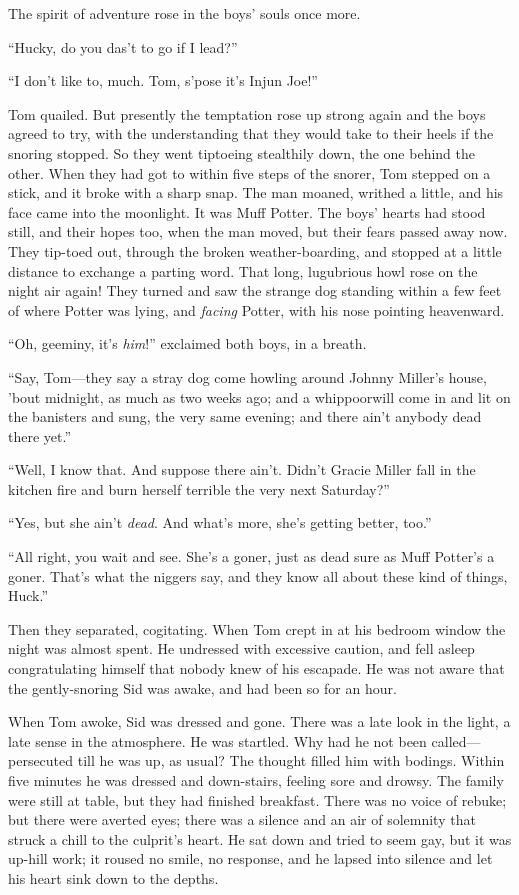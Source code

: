 \documentclass{book}
\begin{document}
The spirit of adventure rose in the boys’ souls once more.

“Hucky, do you das’t to go if I lead?”

“I don’t like to, much. Tom, s’pose it’s Injun Joe!”

Tom quailed. But presently the temptation rose up strong again and the boys agreed to try, with the understanding that they would take to their heels if the snoring stopped. So they went tiptoeing stealthily down, the one behind the other. When they had got to within five steps of the snorer, Tom stepped on a stick, and it broke with a sharp snap. The man moaned, writhed a little, and his face came into the moonlight. It was Muff Potter. The boys’ hearts had stood still, and their hopes too, when the man moved, but their fears passed away now. They tip-toed out, through the broken weather-boarding, and stopped at a little distance to exchange a parting word. That long, lugubrious howl rose on the night air again! They turned and saw the strange dog standing within a few feet of where Potter was lying, and \emph{facing} Potter, with his nose pointing heavenward.

“Oh, geeminy, it’s \emph{him}!” exclaimed both boys, in a breath.

“Say, Tom—they say a stray dog come howling around Johnny Miller’s house, ’bout midnight, as much as two weeks ago; and a whippoorwill come in and lit on the banisters and sung, the very same evening; and there ain’t anybody dead there yet.”

“Well, I know that. And suppose there ain’t. Didn’t Gracie Miller fall in the kitchen fire and burn herself terrible the very next Saturday?”

“Yes, but she ain’t \emph{dead}. And what’s more, she’s getting better, too.”

“All right, you wait and see. She’s a goner, just as dead sure as Muff Potter’s a goner. That’s what the niggers say, and they know all about these kind of things, Huck.”

Then they separated, cogitating. When Tom crept in at his bedroom window the night was almost spent. He undressed with excessive caution, and fell asleep congratulating himself that nobody knew of his escapade. He was not aware that the gently-snoring Sid was awake, and had been so for an hour.

When Tom awoke, Sid was dressed and gone. There was a late look in the light, a late sense in the atmosphere. He was startled. Why had he not been called—persecuted till he was up, as usual? The thought filled him with bodings. Within five minutes he was dressed and down-stairs, feeling sore and drowsy. The family were still at table, but they had finished breakfast. There was no voice of rebuke; but there were averted eyes; there was a silence and an air of solemnity that struck a chill to the culprit’s heart. He sat down and tried to seem gay, but it was up-hill work; it roused no smile, no response, and he lapsed into silence and let his heart sink down to the depths.
\end{document}
